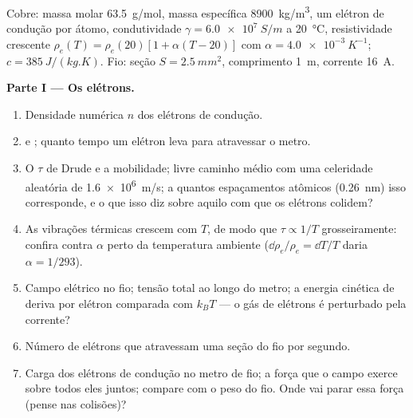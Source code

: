 \begin{problem}
\label{pb:b2:charges-currents-conduction:1}

Cobre: massa molar \qty{63.5}{g/mol}, massa específica \qty{8900}{kg/m^3}, um
elétron de condução por átomo, condutividade $\gamma = \qty{6.0e7}{S/m}$ a
\qty{20}{\degreeCelsius}, resistividade crescente $\rho_e(T) = \rho_e(20)[1 +
\alpha(T - 20)]$ com $\alpha = \qty{4.0e-3}{K^{-1}}$; $c = \qty{385}{J/(kg.K)}$. Fio:
seção $S = \qty{2.5}{mm^2}$, comprimento \qty{1}{m}, corrente \qty{16}{A}.

\medskip
\noindent\textbf{Parte I --- Os elétrons.}
\begin{enumerate}
  \item Densidade numérica $n$ dos elétrons de condução.
  \item {} e ; quanto tempo um elétron leva
        para atravessar o metro.
  \item O $\tau$ de Drude e a mobilidade; livre caminho médio com uma celeridade
        aleatória de \qty{1.6e6}{m/s}; a quantos espaçamentos atômicos (\qty{0.26}{nm})
        isso corresponde, e o que isso diz sobre aquilo com que os elétrons
        colidem?
  \item As vibrações térmicas crescem com $T$, de modo que $\tau \propto 1/T$ grosseiramente:
        confira contra $\alpha$ perto da temperatura ambiente ($\dd\rho_e/\rho_e =
        \dd T/T$ daria $\alpha = 1/293$).
  \item Campo elétrico no fio; tensão total ao longo do metro; a
        energia cinética de deriva por elétron comparada com $k_BT$ ---
        o gás de elétrons é perturbado pela corrente?
  \item Número de elétrons que atravessam uma seção do fio por segundo.
  \item Carga dos elétrons de condução no metro de fio; a
        força que o campo exerce sobre todos eles juntos; compare com
        o peso do fio. Onde vai parar essa força (pense
        nas colisões)?
\end{enumerate}


\end{problem}
